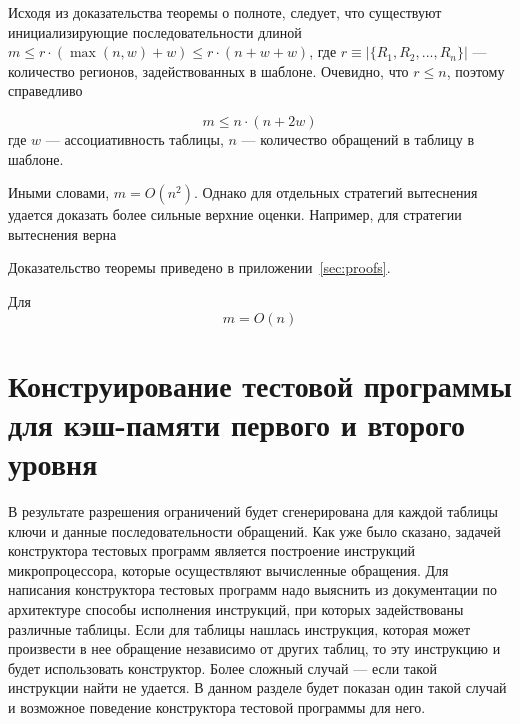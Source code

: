 Исходя из доказательства теоремы о полноте, следует, что существуют инициализирующие последовательности длиной $m \leqslant r \cdot (\max(n,w) + w) \leqslant r \cdot (n + w + w)$, где $r \equiv |\{R_1, R_2, ..., R_n\}|$ --- количество регионов, задействованных в шаблоне. Очевидно, что $r \leqslant n$, поэтому справедливо

\begin{utv}
$$m \leqslant n \cdot (n + 2w)$$
где $w$ --- ассоциативность таблицы, $n$ --- количество обращений в таблицу в шаблоне.
\end{utv}

Иными словами, $m = O(n^2)$. Однако для отдельных стратегий вытеснения удается доказать более сильные верхние оценки. Например, для стратегии вытеснения \LRU верна

\begin{theorem}\label{thm_mirror_lenth_lru} \UpperBoundLRUMirror
\end{theorem}
Доказательство теоремы приведено в приложении~\ref{sec:proofs}.
\begin{sld} Для \LRU
      $$m = O(n)$$
\end{sld}


\section{Конструирование тестовой программы для кэш-памяти первого и второго
уровня}

В результате разрешения ограничений будет сгенерирована для каждой таблицы ключи
и данные последовательности обращений. Как уже было сказано, задачей
конструктора тестовых программ является построение инструкций микропроцессора,
которые осуществляют вычисленные обращения. Для написания конструктора тестовых
программ надо выяснить из документации по архитектуре способы исполнения
инструкций, при которых задействованы различные таблицы. Если для таблицы
нашлась инструкция, которая может произвести в нее обращение независимо от
других таблиц, то эту инструкцию и будет использовать конструктор. Более сложный
случай --- если такой инструкции найти не удается. В данном разделе будет
показан один такой случай и возможное поведение конструктора тестовой программы
для него.

